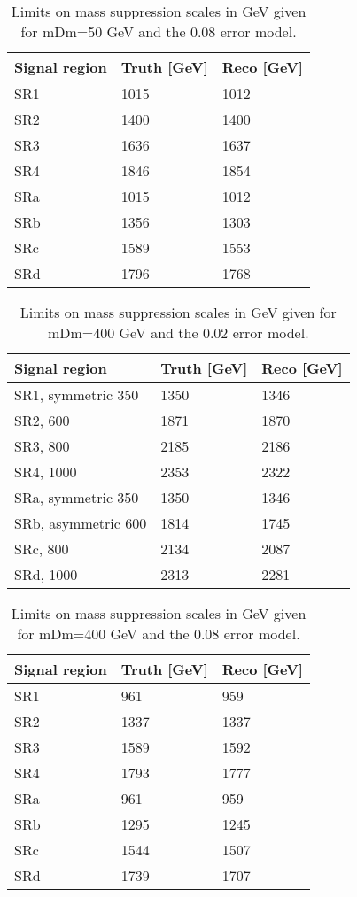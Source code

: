 \begin{table}[ht]
\begin{center}
\begin{tabular}{|l|l|l|}
\hline
Signal region & Truth [GeV]& Reco [GeV]\\ \hline
SR1&1015&1012\\
SR2&1400&1400\\
SR3&1636&1637\\
SR4&1846&1854\\ \hline
SRa&1015&1012\\
SRb&1356&1303\\
SRc&1589&1553\\
SRd&1796&1768\\ \hline
\end{tabular}
\caption{Limits on mass suppression scales in GeV given for mDm=50 GeV and the 0.08 error model.}
\label{tab:masssupp010}
\end{center}
\end{table}

\begin{table}[ht]
\begin{center}
\begin{tabular}{|l|l|l|}
\hline
Signal region & Truth [GeV]& Reco [GeV]\\ \hline
SR1, symmetric 350&1350&1346\\
SR2, 600&1871&1870\\
SR3, 800&2185&2186\\
SR4, 1000&2353&2322\\ \hline
SRa, symmetric 350&1350&1346\\
SRb, asymmetric 600&1814&1745\\
SRc, 800&2134&2087\\
SRd, 1000&2313&2281\\ \hline
\end{tabular}
\caption{Limits on mass suppression scales in GeV given for mDm=400 GeV and the 0.02 error model.}
\label{tab:masssupp2002}
\end{center}
\end{table}

\begin{table}[ht]
\begin{center}
\begin{tabular}{|l|l|l|}
\hline
Signal region & Truth [GeV]& Reco [GeV]\\ \hline
SR1&961&959\\
SR2&1337&1337\\
SR3&1589&1592\\
SR4&1793&1777\\ \hline

SRa&961&959\\
SRb&1295&1245\\
SRc&1544&1507\\
SRd&1739&1707\\ \hline
\end{tabular}
\caption{Limits on mass suppression scales in GeV given for mDm=400 GeV and the 0.08 error model.}
\label{tab:masssupp2010}
\end{center}
\end{table}

